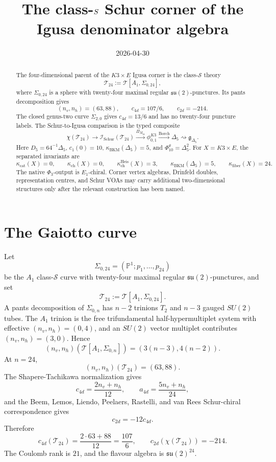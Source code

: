 \documentclass[11pt]{article}
\title{The class-\texorpdfstring{$\cS$}{S} Schur corner of the Igusa denominator algebra}
\author{}
\date{2026-04-30}
\providecommand{\PP}{\mathbb{P}}
\providecommand{\cI}{\mathcal{I}}
\providecommand{\cS}{\mathcal{S}}
\providecommand{\cT}{\mathcal{T}}
\providecommand{\fg}{\mathfrak{g}}
\providecommand{\fsu}{\mathfrak{su}}
\providecommand{\Borch}{\mathrm{Borch}}
\providecommand{\kcat}{\kappa_{\mathrm{cat}}}
\providecommand{\kch}{\kappa_{\mathrm{ch}}}
\providecommand{\kBKM}{\kappa_{\mathrm{BKM}}}
\providecommand{\kfib}{\kappa_{\mathrm{fiber}}}
\begin{document}
\maketitle

\begin{abstract}
The four-dimensional parent of the \(K3\times E\) Igusa corner is the
class-\(\cS\) theory
\[
  \cT_{24}:=\cT[A_1,\Sigma_{0,24}],
\]
where \(\Sigma_{0,24}\) is a sphere with twenty-four maximal regular
\(\fsu(2)\)-punctures. Its pants decomposition gives
\[
  (n_v,n_h)=(63,88),\qquad c_{4d}=107/6,\qquad c_{2d}=-214.
\]
The closed genus-two curve \(\Sigma_{2,0}\) gives \(c_{4d}=13/6\) and
has no twenty-four puncture labels. The Schur-to-Igusa comparison is the
typed composite
\[
  \chi(\cT_{24})
  \longrightarrow
  \cI_{\mathrm{Schur}}(\cT_{24})
  \xrightarrow{\Pi_{M_{24}}}
  \phi_{0,1}^{K3}
  \xrightarrow{\Borch}
  \Delta_5
  \rightsquigarrow
  \fg_{\Delta_5}.
\]
Here \(D_5=64^{-1}\Delta_5\), \(c_1(0)=10\),
\(\kBKM(\Delta_5)=5\), and \(\Phi_{10}^{\theta}=\Delta_5^2\).
For \(X=K3\times E\), the separated invariants are
\[
  \kcat(X)=0,\qquad \kch(X)=0,\qquad
  \kch^{\mathrm{Heis}}(X)=3,\qquad
  \kBKM(\Delta_5)=5,\qquad \kfib(X)=24.
\]
The native \(\Phi_3\)-output is \(E_1\)-chiral. Corner vertex algebras,
Drinfeld doubles, representation centres, and Schur VOAs may carry
additional two-dimensional structures only after the relevant
construction has been named.
\end{abstract}

\section{The Gaiotto curve}

Let
\[
  \Sigma_{0,24}=(\PP^1;p_1,\ldots,p_{24})
\]
be the \(A_1\) class-\(\cS\) curve with twenty-four maximal regular
\(\fsu(2)\)-punctures, and set
\[
  \cT_{24}:=\cT[A_1,\Sigma_{0,24}].
\]
A pants decomposition of \(\Sigma_{0,n}\) has \(n-2\) trinions \(T_2\)
and \(n-3\) gauged \(SU(2)\) tubes. The \(A_1\) trinion is the free
trifundamental half-hypermultiplet system with effective
\((n_v,n_h)=(0,4)\), and an \(SU(2)\) vector multiplet contributes
\((n_v,n_h)=(3,0)\). Hence
\[
  (n_v,n_h)(\cT[A_1,\Sigma_{0,n}])
  =
  (3(n-3),4(n-2)).
\]
At \(n=24\),
\[
  (n_v,n_h)(\cT_{24})=(63,88).
\]
The Shapere-Tachikawa normalization gives
\[
  c_{4d}=\frac{2n_v+n_h}{12},\qquad
  a_{4d}=\frac{5n_v+n_h}{24},
\]
and the Beem, Lemos, Liendo, Peelaers, Rastelli, and van Rees
Schur-chiral correspondence gives
\[
  c_{2d}=-12c_{4d}.
\]
Therefore
\[
  c_{4d}(\cT_{24})
  =
  \frac{2\cdot63+88}{12}
  =
  \frac{107}{6},
  \qquad
  c_{2d}(\chi(\cT_{24}))=-214.
\]
The Coulomb rank is \(21\), and the flavour algebra is
\(\fsu(2)^{24}\).
\end{document}

